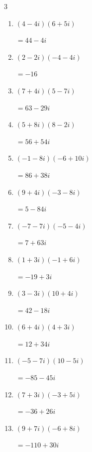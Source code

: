 \begin{multicols}{3}
\begin{enumerate}
        $\displaystyle =-145i$

  \item $\displaystyle (4-4i)(6+5i)$

        $\displaystyle =44-4i$

  \item $\displaystyle (2-2i)(-4-4i)$

        $\displaystyle =-16$

  \item $\displaystyle (7+4i)(5-7i)$

        $\displaystyle =63-29i$

  \item $\displaystyle (5+8i)(8-2i)$

        $\displaystyle =56+54i$

  \item $\displaystyle (-1-8i)(-6+10i)$

        $\displaystyle =86+38i$

  \item $\displaystyle (9+4i)(-3-8i)$

        $\displaystyle =5-84i$

  \item $\displaystyle (-7-7i)(-5-4i)$

        $\displaystyle =7+63i$

\columnbreak %

  \item $\displaystyle (1+3i)(-1+6i)$

        $\displaystyle =-19+3i$

  \item $\displaystyle (3-3i)(10+4i)$

        $\displaystyle =42-18i$

  \item $\displaystyle (6+4i)(4+3i)$

        $\displaystyle =12+34i$

  \item $\displaystyle (-5-7i)(10-5i)$

        $\displaystyle =-85-45i$

  \item $\displaystyle (7+3i)(-3+5i)$

        $\displaystyle =-36+26i$

  \item $\displaystyle (9+7i)(-6+8i)$

        $\displaystyle =-110+30i$


\end{enumerate}
\end{multicols}
